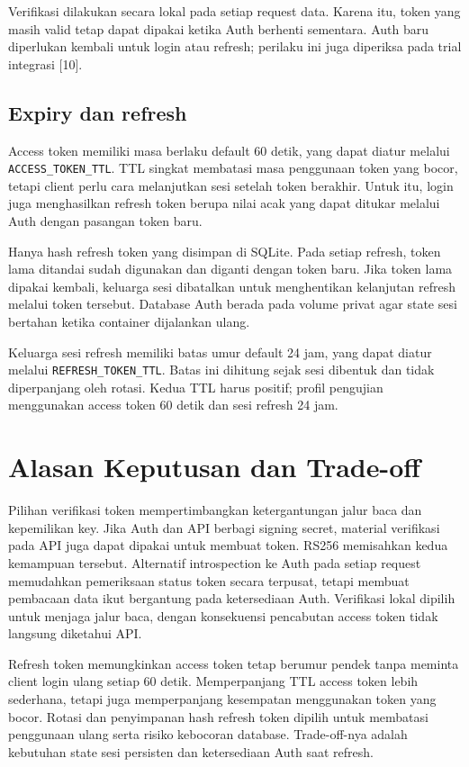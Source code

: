 Verifikasi dilakukan secara lokal pada setiap request data. Karena itu, token yang masih valid tetap dapat dipakai ketika Auth berhenti sementara. Auth baru diperlukan kembali untuk login atau refresh; perilaku ini juga diperiksa pada trial integrasi [10].

\subsection{Expiry dan refresh}
Access token memiliki masa berlaku default 60 detik, yang dapat diatur melalui \texttt{ACCESS\_TOKEN\_TTL}. TTL singkat membatasi masa penggunaan token yang bocor, tetapi client perlu cara melanjutkan sesi setelah token berakhir. Untuk itu, login juga menghasilkan refresh token berupa nilai acak yang dapat ditukar melalui Auth dengan pasangan token baru.

Hanya hash refresh token yang disimpan di SQLite. Pada setiap refresh, token lama ditandai sudah digunakan dan diganti dengan token baru. Jika token lama dipakai kembali, keluarga sesi dibatalkan untuk menghentikan kelanjutan refresh melalui token tersebut. Database Auth berada pada volume privat agar state sesi bertahan ketika container dijalankan ulang.

Keluarga sesi refresh memiliki batas umur default 24 jam, yang dapat diatur melalui \texttt{REFRESH\_TOKEN\_TTL}. Batas ini dihitung sejak sesi dibentuk dan tidak diperpanjang oleh rotasi. Kedua TTL harus positif; profil pengujian menggunakan access token 60 detik dan sesi refresh 24 jam.

\section{Alasan Keputusan dan Trade-off}
Pilihan verifikasi token mempertimbangkan ketergantungan jalur baca dan kepemilikan key. Jika Auth dan API berbagi signing secret, material verifikasi pada API juga dapat dipakai untuk membuat token. RS256 memisahkan kedua kemampuan tersebut. Alternatif introspection ke Auth pada setiap request memudahkan pemeriksaan status token secara terpusat, tetapi membuat pembacaan data ikut bergantung pada ketersediaan Auth. Verifikasi lokal dipilih untuk menjaga jalur baca, dengan konsekuensi pencabutan access token tidak langsung diketahui API.

Refresh token memungkinkan access token tetap berumur pendek tanpa meminta client login ulang setiap 60 detik. Memperpanjang TTL access token lebih sederhana, tetapi juga memperpanjang kesempatan menggunakan token yang bocor. Rotasi dan penyimpanan hash refresh token dipilih untuk membatasi penggunaan ulang serta risiko kebocoran database. Trade-off-nya adalah kebutuhan state sesi persisten dan ketersediaan Auth saat refresh.

